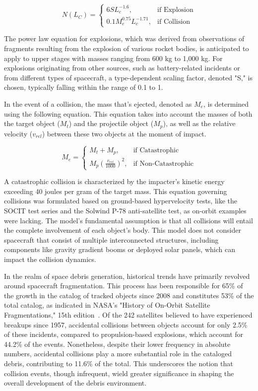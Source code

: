\documentclass[letterpaper, paper,11pt]{AAS}
\begin{document}
\begin{equation}
N(L_C) = \begin{cases} 
    6 S L_c^{-1.6}, & \text{if Explosion}\\
    0.1 M_e^{0.75} L_c^{-1.71}, & \text{if Collision}
\end{cases}
\end{equation}

The power law equation for explosions, which was derived from observations of fragments resulting from the explosion of various rocket bodies, is anticipated to apply to upper stages with masses ranging from 600 kg to 1,000 kg. For explosions originating from other sources, such as battery-related incidents or from different types of spacecraft, a type-dependent scaling factor, denoted "S," is chosen, typically falling within the range of 0.1 to 1.

In the event of a collision, the mass that's ejected, denoted as $M_e$, is determined using the following equation. This equation takes into account the masses of both the target object ($M_t$) and the projectile object ($M_p$), as well as the relative velocity ($v_{rel}$) between these two objects at the moment of impact.

\begin{equation}
M_e= \begin{cases}
    M_t + M_p, & \text{if Catastrophic} \\
    M_p\left( \frac{v_{rel}}{1000} \right)^2, & \text{if Non-Catastrophic}
\end{cases}
\end{equation}

A catastrophic collision is characterized by the impacter's kinetic energy exceeding 40 joules per gram of the target mass. This equation governing collisions was formulated based on ground-based hypervelocity tests, like the SOCIT test series and the Solwind P-78 anti-satellite test, as on-orbit examples were lacking. The model's fundamental assumption is that all collisions will entail the complete involvement of each object's body. This model does not consider spacecraft that consist of multiple interconnected structures, including components like gravity gradient booms or deployed solar panels, which can impact the collision dynamics.

In the realm of space debris generation, historical trends have primarily revolved around spacecraft fragmentation. This process has been responsible for 65\% of the growth in the catalog of tracked objects since 2008 and constitutes 53\% of the total catalog, as indicated in NASA's "History of On-Orbit Satellite Fragmentations," 15th edition~\cite{anz-meador_assessment_2004}. Of the 242 satellites believed to have experienced breakups since 1957, accidental collisions between objects account for only 2.5\% of these incidents, compared to propulsion-based explosions, which account for 44.2\% of the events. Nonetheless, despite their lower frequency in absolute numbers, accidental collisions play a more substantial role in the cataloged debris, contributing to 11.6\% of the total. This underscores the notion that collision events, though infrequent, wield greater significance in shaping the overall development of the debris environment.
\end{document}
